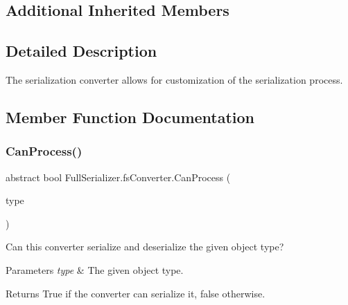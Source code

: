 \subsection*{Additional Inherited Members}


\subsection{Detailed Description}
The serialization converter allows for customization of the serialization process. 



\subsection{Member Function Documentation}
\mbox{\label{class_full_serializer_1_1fs_converter_a6d9e084c5e7f646a8d220705efaecb35}} 
\subsubsection{\texorpdfstring{Can\+Process()}{CanProcess()}}
{\footnotesize\ttfamily abstract bool Full\+Serializer.\+fs\+Converter.\+Can\+Process (\begin{DoxyParamCaption}\item[{Type}]{type }\end{DoxyParamCaption})\hspace{0.3cm}{\ttfamily [pure virtual]}}



Can this converter serialize and deserialize the given object type? 


\begin{DoxyParams}{Parameters}
{\em type} & The given object type.\\
\hline
\end{DoxyParams}
\begin{DoxyReturn}{Returns}
True if the converter can serialize it, false otherwise.
\end{DoxyReturn}



